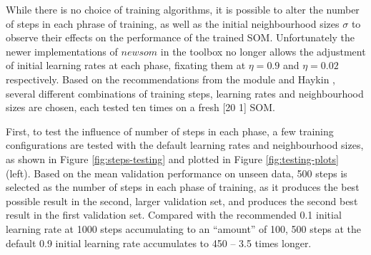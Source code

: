 \documentclass[10pt, oneside]{article}
\begin{document}
While there is no choice of training algorithms, it is possible to alter the number of steps in each phrase of training, as well as the initial neighbourhood sizes $\sigma$ to observe their effects on the performance of the trained SOM. Unfortunately the newer implementations of $newsom$ in the toolbox no longer allows the adjustment of initial learning rates at each phase, fixating them at $\eta=0.9$ and $\eta=0.02$ respectively\cite{newsom-matlab}. Based on the recommendations from the module \cite{som-lecture} and Haykin \cite{haykin2008}, several different combinations of training steps, learning rates and neighbourhood sizes are chosen, each tested ten times on a fresh [20 1] SOM. 

First, to test the influence of number of steps in each phase, a few training configurations are tested with the default learning rates and neighbourhood sizes, as shown in Figure \ref{fig:steps-testing} and plotted in Figure \ref{fig:testing-plots} (left). Based on the mean validation performance on unseen data, 500 steps is selected as the number of steps in each phase of training, as it produces the best possible result in the second, larger validation set, and produces the second best result in the first validation set. Compared with the recommended 0.1 initial learning rate at 1000 steps accumulating to an ``amount'' of 100, 500 steps at the default 0.9 initial learning rate accumulates to 450 -- 3.5 times longer.
\end{document}
